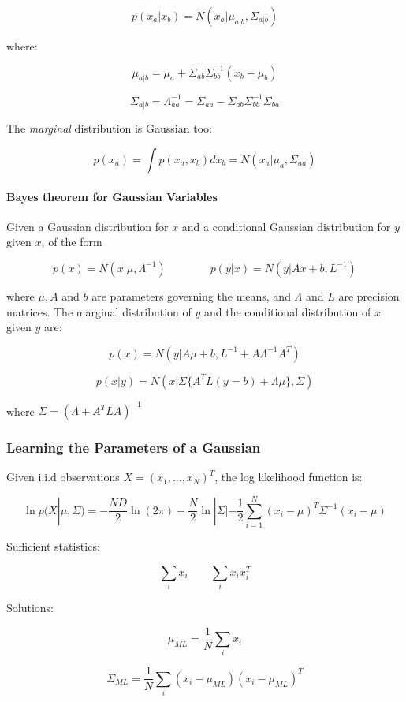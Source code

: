 \documentclass{article}
\begin{document}
\[p(x_a | x_b) = N(x_a | \mu_{a|b}, \Sigma_{a|b})\]

where:

\[\mu_{a|b} = \mu_a + \Sigma_{ab} \Sigma_{bb}^{-1} (x_b - \mu_b)\]

\[\Sigma_{a|b} = \Lambda_{aa}^{-1} = \Sigma_{aa} - \Sigma_{ab} \Sigma_{bb}^{-1}
\Sigma_{ba}\]

The \emph{marginal} distribution is Gaussian too:

\[p(x_a) = \int p(x_a, x_b) dx_b = N(x_a | \mu_a, \Sigma_{aa})\]

\paragraph{Bayes theorem for Gaussian
Variables}\label{bayes-theorem-for-gaussian-variables}

Given a Gaussian distribution for \(x\) and a conditional Gaussian
distribution for \(y\) given \(x\), of the form

\[p(x) = N(x|\mu, \Lambda^{-1}) \qquad \qquad p(y|x) = N(y | Ax + b, L^{-1})\]

where \(\mu, A\) and \(b\) are parameters governing the means, and
\(\Lambda\) and \(L\) are precision matrices. The marginal distribution
of \(y\) and the conditional distribution of \(x\) given \(y\) are:

\[p(x) = N(y | A\mu + b, L^{-1} + A \Lambda^{-1} A^T)\]

\[p(x | y) = N(x | \Sigma\{A^T L(y = b) + \Lambda \mu \}, \Sigma )\]

where \(\Sigma = (\Lambda + A^T L A)^{-1}\)

\subsubsection{Learning the Parameters of a
Gaussian}\label{learning-the-parameters-of-a-gaussian}

Given i.i.d observations \(X = (x_1, ..., x_N)^T\), the log likelihood
function is:

\[\ln p(X| \mu, \Sigma) = - \frac{ND}{2} \ln (2\pi) - \frac{N}{2} \ln |\Sigma| -
\frac{1}{2} \sum_{i=1}^N (x_i - \mu)^T \Sigma^{-1} (x_i - \mu)\]

Sufficient statistics:

\[\sum_i x_i \qquad \sum_i x_i x_i^T\]

Solutions:

\[\mu_{ML} = \frac{1}{N} \sum_i x_i\]

\[\Sigma_{ML} = \frac{1}{N} \sum_i (x_i - \mu_{ML})(x_i - \mu_{ML})^T\]
\end{document}
